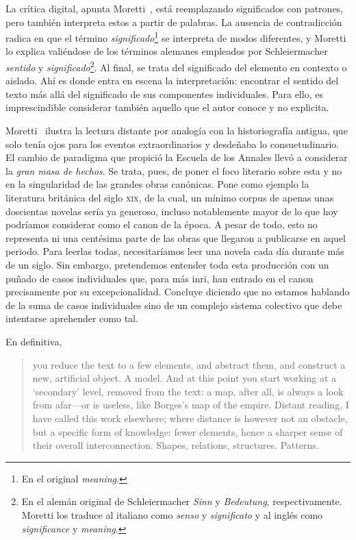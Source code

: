 La crítica digital, apunta Moretti~\parencite*[6-7]{moretti2017}, está reemplazando significados con patrones, pero también interpreta estos a partir de palabras. La ausencia de contradicción radica en que el término \textit{significado}\footnote{En el original \textit{meaning}.} se interpreta de modos diferentes, y Moretti lo explica valiéndose de los términos alemanes empleados por Schleiermacher \textit{sentido} y \textit{significado}\footnote{En el alemán original de Schleiermacher \textit{Sinn} y \textit{Bedeutung}, respectivamente. Moretti los traduce al italiano como \textit{senso} y \textit{significato} y al inglés como \textit{significance} y \textit{meaning}.}. Al final, se trata del significado del elemento en contexto o aislado. Ahí es donde entra en escena la interpretación: encontrar el sentido del texto más allá del significado de sus componentes individuales. Para ello, es imprescindible considerar también aquello que el autor conoce y no explicita.

Moretti~\parencite*[67]{moretti2003} ilustra la lectura distante por analogía con la historiografía antigua, que solo tenía ojos para los eventos extraordinarios y desdeñaba lo consuetudinario. El cambio de paradigma que propició la Escuela de los Annales llevó a considerar la \textit{gran masa de hechos}. Se trata, pues, de poner el foco literario sobre esta y no en la singularidad de las grandes obras canónicas. Pone como ejemplo la literatura británica del siglo \textsc{xix}, de la cual, un mínimo corpus de apenas unas doscientas novelas sería ya generoso, incluso notablemente mayor de lo que hoy podríamos considerar como el canon de la época. A pesar de todo, esto no representa ni una centésima parte de las obras que llegaron a publicarse en aquel periodo. Para leerlas todas, necesitaríamos leer una novela cada día durante más de un siglo. Sin embargo, pretendemos entender toda esta producción con un puñado de casos individuales que, para más inri, han entrado en el canon precisamente por su excepcionalidad. Concluye diciendo que no estamos hablando de la suma de casos individuales sino de un complejo sistema colectivo que debe intentarse aprehender como tal.

En definitiva, \blockquote{\begin{english}you reduce the text to a few elements, and abstract them, and construct a new, artificial object. A model. And at this point you start working at a ‘secondary’ level, removed from the text: a map, after all, is always a look from afar—or is useless, like Borges’s map of the empire. Distant reading, I have called this work elsewhere; where distance is however not an obstacle, but a specific form of knowledge: fewer elements, hence a sharper sense of their overall interconnection. Shapes, relations, structures. Patterns.\end{english} \parencite[94]{moretti2004}}


